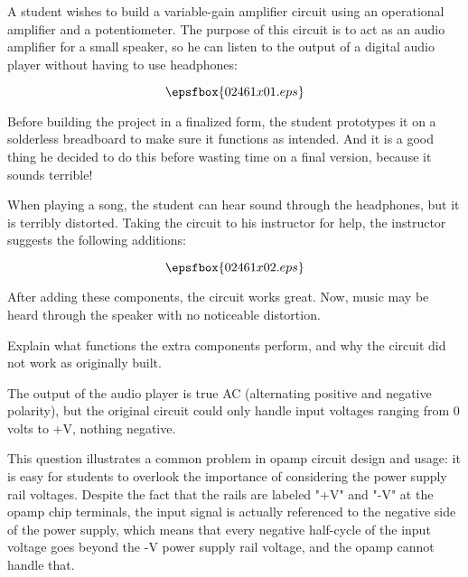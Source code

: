 

A student wishes to build a variable-gain amplifier circuit using an operational amplifier and a potentiometer.  The purpose of this circuit is to act as an audio amplifier for a small speaker, so he can listen to the output of a digital audio player without having to use headphones:

$$\epsfbox{02461x01.eps}$$

Before building the project in a finalized form, the student prototypes it on a solderless breadboard to make sure it functions as intended.  And it is a good thing he decided to do this before wasting time on a final version, because it sounds terrible!

When playing a song, the student can hear sound through the headphones, but it is terribly distorted.  Taking the circuit to his instructor for help, the instructor suggests the following additions:

$$\epsfbox{02461x02.eps}$$

After adding these components, the circuit works great.  Now, music may be heard through the speaker with no noticeable distortion.

Explain what functions the extra components perform, and why the circuit did not work as originally built.







The output of the audio player is true AC (alternating positive and negative polarity), but the original circuit could only handle input voltages ranging from 0 volts to +V, nothing negative.







This question illustrates a common problem in opamp circuit design and usage: it is easy for students to overlook the importance of considering the power supply rail voltages.  Despite the fact that the rails are labeled "+V" and "-V" at the opamp chip terminals, the input signal is actually referenced to the negative side of the power supply, which means that every negative half-cycle of the input voltage goes beyond the -V power supply rail voltage, and the opamp cannot handle that.

